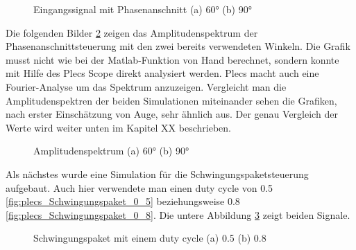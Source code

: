 \begin{figure}[h]
	\centering
	\qquad
	\caption{Eingangssignal mit Phasenanschnitt (a) 60° (b) 90°}
	\label{fig:Eingangssignal simuliert mit Plecs}
\end{figure}

Die folgenden Bilder \ref{fig:plecs_Amplitudenspektrum} zeigen das Amplitudenspektrum der Phasenanschnittsteuerung mit den zwei bereits verwendeten Winkeln. Die Grafik musst nicht wie bei der Matlab-Funktion von Hand berechnet, sondern konnte mit Hilfe des Plecs Scope direkt analysiert werden. Plecs macht auch eine Fourier-Analyse um das Spektrum anzuzeigen. Vergleicht man die Amplitudenspektren der beiden Simulationen miteinander sehen die Grafiken, nach erster Einschätzung von Auge, sehr ähnlich aus. Der genau Vergleich der Werte wird weiter unten im Kapitel XX beschrieben.   
     
\begin{figure}[h]
	\centering
	\qquad
	\caption{Amplitudenspektrum (a) 60° (b) 90°}
	\label{fig:plecs_Amplitudenspektrum}
\end{figure}

Als nächstes wurde eine Simulation für die Schwingungspaketsteuerung aufgebaut. Auch hier verwendete man einen duty cycle von 0.5 \ref{fig:plecs_Schwingungspaket_0_5} beziehungsweise 0.8 \ref{fig:plecs_Schwingungspaket_0_8}. Die untere Abbildung \ref{fig:plecs_Schwingungspakete} zeigt beiden Signale.  
\begin{figure}[h]
	\centering
	\qquad
	\caption{Schwingungspaket mit einem duty cycle (a) 0.5 (b) 0.8}
	\label{fig:plecs_Schwingungspakete}
\end{figure}

